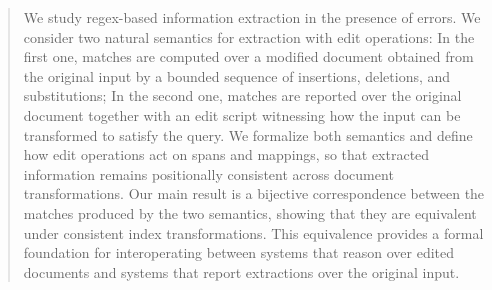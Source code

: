 
\begin{abstract}

We study regex-based information extraction in the presence of errors. We consider two natural semantics for extraction with edit operations: In the first one, matches are computed over a modified document obtained from the original input by a bounded sequence of insertions, deletions, and substitutions; In the second one, matches are reported over the original document together with an edit script witnessing how the input can be transformed to satisfy the query. We formalize both semantics and define how edit operations act on spans and mappings, so that extracted information remains positionally consistent across document transformations. Our main result is a bijective correspondence between the matches produced by the two semantics, showing that they are equivalent under consistent index transformations. This equivalence provides a formal foundation for interoperating between systems that reason over edited documents and systems that report extractions over the original input.

\end{abstract}